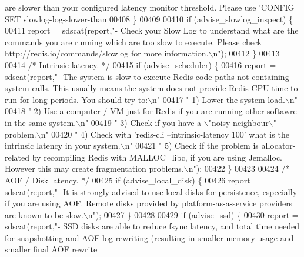 \begin{DoxyCode}
{{{       are slower than your configured latency monitor threshold. Please use 'CONFIG SET slowlog-log-slower-than
00408         \}
00409 
00410         \textcolor{keywordflow}{if} (advise\_slowlog\_inspect) \{
00411             report = sdscat(report,\textcolor{stringliteral}{"- Check your Slow Log to understand what are the commands you are
       running which are too slow to execute. Please check http://redis.io/commands/slowlog for more
       information.\(\backslash\)n"});
00412         \}
00413 
00414         \textcolor{comment}{/* Intrinsic latency. */}
00415         \textcolor{keywordflow}{if} (advise\_scheduler) \{
00416             report = sdscat(report,\textcolor{stringliteral}{"- The system is slow to execute Redis code paths not containing
       system calls. This usually means the system does not provide Redis CPU time to run for long periods. You
       should try to:\(\backslash\)n"}
00417             \textcolor{stringliteral}{"  1) Lower the system load.\(\backslash\)n"}
00418             \textcolor{stringliteral}{"  2) Use a computer / VM just for Redis if you are running other softawre in the same
       system.\(\backslash\)n"}
00419             \textcolor{stringliteral}{"  3) Check if you have a \(\backslash\)"noisy neighbour\(\backslash\)" problem.\(\backslash\)n"}
00420             \textcolor{stringliteral}{"  4) Check with 'redis-cli --intrinsic-latency 100' what is the intrinsic latency in your
       system.\(\backslash\)n"}
00421             \textcolor{stringliteral}{"  5) Check if the problem is allocator-related by recompiling Redis with MALLOC=libc, if
       you are using Jemalloc. However this may create fragmentation problems.\(\backslash\)n"});
00422         \}
00423 
00424         \textcolor{comment}{/* AOF / Disk latency. */}
00425         \textcolor{keywordflow}{if} (advise\_local\_disk) \{
00426             report = sdscat(report,\textcolor{stringliteral}{"- It is strongly advised to use local disks for persistence,
       especially if you are using AOF. Remote disks provided by platform-as-a-service providers are known to be
       slow.\(\backslash\)n"});
00427         \}
00428 
00429         \textcolor{keywordflow}{if} (advise\_ssd) \{
00430             report = sdscat(report,\textcolor{stringliteral}{"- SSD disks are able to reduce fsync latency, and total time
       needed for snapshotting and AOF log rewriting (resulting in smaller memory usage and smaller final AOF rewrite
}}}}
\end{DoxyCode}
